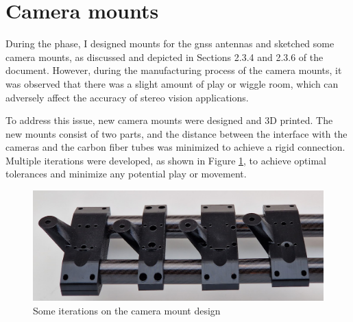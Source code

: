 \section{Camera mounts}
During the \preproject phase, I designed mounts for the \gls{gnss} antennas and sketched some camera mounts, as discussed and depicted in Sections 2.3.4 and 2.3.6 of the \preproject document.
However, during the manufacturing process of the camera mounts, it was observed that there was a slight amount of play or wiggle room, which can adversely affect the accuracy of stereo vision applications.

To address this issue, new camera mounts were designed and 3D printed.
The new mounts consist of two parts, and the distance between the interface with the cameras and the carbon fiber tubes was minimized to achieve a rigid connection.
Multiple iterations were developed, as shown in Figure \ref{fig:cam_mounts_iterations}, to achieve optimal tolerances and minimize any potential play or movement.


\begin{figure}[H]
    \centering
    \includegraphics[width=\textwidth]{figures/3d_print/cam_mounts.png}
    \caption{Some iterations on the camera mount design}
    \label{fig:cam_mounts_iterations}
\end{figure}
